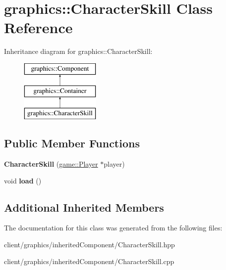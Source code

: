 \hypertarget{classgraphics_1_1_character_skill}{\section{graphics\-:\-:Character\-Skill Class Reference}
\label{classgraphics_1_1_character_skill}
}
Inheritance diagram for graphics\-:\-:Character\-Skill\-:\begin{figure}[H]
\begin{center}
\leavevmode
\includegraphics[height=3.000000cm]{classgraphics_1_1_character_skill}
\end{center}
\end{figure}
\subsection*{Public Member Functions}
\begin{DoxyCompactItemize}
\item 
\hypertarget{classgraphics_1_1_character_skill_a7732d723c145805d0e1661d5a770e809}{{\bfseries Character\-Skill} (\hyperlink{classgame_1_1_player}{game\-::\-Player} $\ast$player)}\label{classgraphics_1_1_character_skill_a7732d723c145805d0e1661d5a770e809}

\item 
\hypertarget{classgraphics_1_1_character_skill_add819c542513e2435d4b4f662be4a0b8}{void {\bfseries load} ()}\label{classgraphics_1_1_character_skill_add819c542513e2435d4b4f662be4a0b8}

\end{DoxyCompactItemize}
\subsection*{Additional Inherited Members}


The documentation for this class was generated from the following files\-:\begin{DoxyCompactItemize}
\item 
client/graphics/inherited\-Component/Character\-Skill.\-hpp\item 
client/graphics/inherited\-Component/Character\-Skill.\-cpp\end{DoxyCompactItemize}
